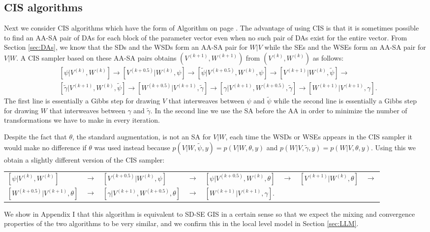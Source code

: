 \documentclass[12pt]{article}
\begin{document}
\subsection{CIS algorithms}\label{sec:Algs:CIS}
Next we consider CIS algorithms which have the form of Algorithm  on page \pageref{alg:CIS}. The advantage of using CIS is that it is sometimes possible to find an AA-SA pair of DAs for each block of the parameter vector even when no such pair of DAs exist for the entire vector. From Section \ref{sec:DAs}, we know that the SDs and the WSDs form an AA-SA pair for $W|V$ while the SEs and the WSEs form an AA-SA pair for $V|W$.  A CIS sampler based on these AA-SA pairs obtains $(V^{(k+1)},W^{(k+1)})$ from $(V^{(k)},W^{(k)})$ as follows:
\begin{align*}
&[\psi|V^{(k)},W^{(k)}] \to [V^{(k+0.5)}|W^{(k)},\psi] \to [\tilde{\psi}|V^{(k+0.5)},W^{(k)},\psi] \to [V^{(k+1)}|W^{(k)},\tilde{\psi}]\to\\
&[\tilde{\gamma}|V^{(k+1)},W^{(k)},\tilde{\psi}] \to [W^{(k+0.5)}|V^{(k+1)},\tilde{\gamma}] \to [\gamma|V^{(k+1)},W^{(k+0.5)},\tilde{\gamma}]\to [W^{(k+1)}|V^{(k+1)},\gamma].
\end{align*}
The first line is essentially a Gibbs step for drawing $V$ that interweaves between $\psi$ and $\tilde{\psi}$ while the second line is essentially a Gibbs step for drawing $W$ that interweaves between $\gamma$ and $\tilde{\gamma}$. In the second line we use the SA before the AA in order to minimize the number of transformations we have to make in every iteration. 

Despite the fact that $\theta$, the standard augmentation, is not an SA for $V|W$, each time the WSDs or WSEs appears in the CIS sampler it would make no difference if $\theta$ was used instead because $p(V|W,\tilde{\psi},y)=p(V|W,\theta,y)$ and $p(W|V,\tilde{\gamma},y)=p(W|V,\theta,y)$. Using this we obtain a slightly different version of the CIS sampler: \vspace{-.1cm}
{\small
\begin{center}
\begin{tabular}{llllllll}
$[\psi|V^{(k)},W^{(k)}]$ & $\to$ & $[V^{(k+0.5)}|W^{(k)},\psi]$ & $\to$ & $[\psi|V^{(k+0.5)},W^{(k)},\theta]$ & $\to$ & $[V^{(k+1)}|W^{(k)},\theta]$ & $\to$ \\
$[W^{(k+0.5)}|V^{(k+1)},\theta]$ & $\to$ & $[\gamma|V^{(k+1)},W^{(k+0.5)},\theta]$ & $\to$ & $[W^{(k+1)}|V^{(k+1)},\gamma]$.&&&
\end{tabular}
\end{center}
}
\noindent We show in Appendix I that this algorithm is equivalent to SD-SE GIS in a certain sense so that we expect the mixing and convergence properties of the two algorithms to be very similar, and we confirm this in the local level model in Section \ref{sec:LLM}.
\end{document}
